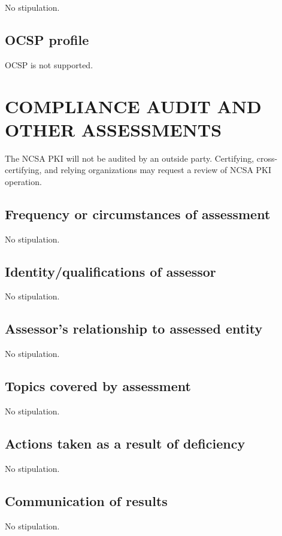 \documentclass[10pt]{article}
\begin{document}
No stipulation.

\subsection{OCSP profile}

OCSP is not supported.

\section{COMPLIANCE AUDIT AND OTHER ASSESSMENTS}

The NCSA PKI will not be audited by an outside party. Certifying,
cross-certifying, and relying organizations may request a review of
NCSA PKI operation.

\subsection{Frequency or circumstances of assessment}

No stipulation.

\subsection{Identity/qualifications of assessor}

No stipulation.

\subsection{Assessor's relationship to assessed entity}

No stipulation.

\subsection{Topics covered by assessment}

No stipulation.

\subsection{Actions taken as a result of deficiency}

No stipulation.

\subsection{Communication of results}

No stipulation.
\end{document}
